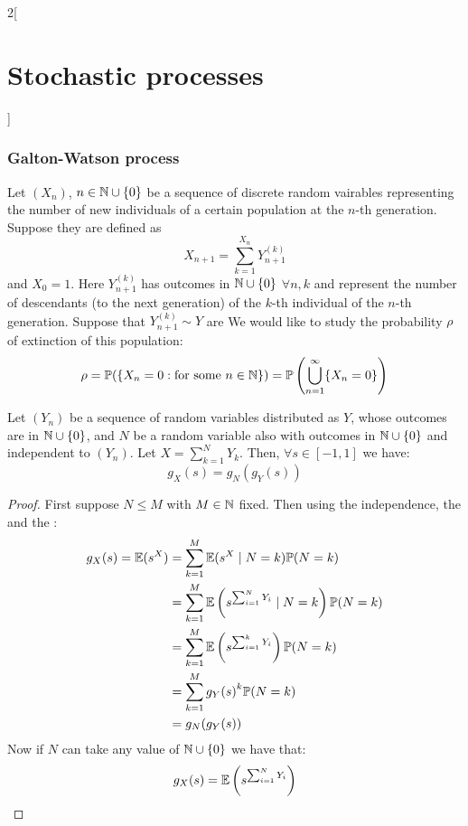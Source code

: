 \documentclass[../../../main_math.tex]{subfiles}
\begin{document}
\begin{multicols}{2}[\section{Stochastic processes}]
  \subsubsection{Galton-Watson process}
  \begin{model}\label{SP:galtonwatsonModel}
    Let $(X_n)$, $n\in\mathbb{N}\cup\{0\}$ be a sequence of discrete random vairables representing the number of new individuals of a certain population at the $n$-th generation. Suppose they are defined as $$X_{n+1}=\sum_{k=1}^{X_n}Y_{n+1}^{(k)}$$ and $X_0=1$. Here $Y_{n+1}^{(k)}$ has outcomes in $\mathbb{N}\cup\{0\}$ $\forall n,k$ and represent the number of descendants (to the next generation) of the $k$-th individual of the $n$-th generation. Suppose that $Y_{n+1}^{(k)}\sim Y$ are \iid We would like to study the probability $\rho$ of extinction of this population: $$\rho=\mathbb{P}(\{X_n=0:\text{for some $n\in\mathbb{N}$}\})=\mathbb{P}\left(\bigcup_{n=1}^\infty\{X_n=0\}\right)$$
  \end{model}
  \begin{lemma}\label{SP:lemmaGaltonWatson}
    Let $(Y_n)$ be a sequence of \iid random variables distributed as $Y$, whose outcomes are in $\mathbb{N}\cup\{0\}$, and $N$ be a random variable also with outcomes in $\mathbb{N}\cup\{0\}$ and independent to $(Y_n)$. Let $X=\sum_{k=1}^NY_k$. Then, $\forall s\in[-1,1]$ we have: $$g_X(s)=g_N(g_Y(s))$$
  \end{lemma}
  \begin{proof}
    First suppose $N\leq M$ with $M\in\mathbb{N}$ fixed. Then using the independence, the  and the :
    \begin{align*}
      g_X(s)=\mathbb{E}(s^X) & =\sum_{k=1}^M\mathbb{E}(s^X\mid N=k)\mathbb{P}(N=k)                                        \\
                       & = \sum_{k=1}^{M} \mathbb{E}\left(s^{\sum_{i=1}^{N}Y_i} \mid N = k\right) \mathbb{P}(N = k) \\
                       & = \sum_{k=1}^{M} \mathbb{E}\left(s^{\sum_{i=1}^{k}Y_i}\right) \mathbb{P}(N = k)            \\
                       & = \sum_{k=1}^{M} {g_Y(s)}^k \mathbb{P}(N = k)                                        \\
                       & = g_N(g_Y(s))
    \end{align*}
    Now if $N$ can take any value of $\mathbb{N}\cup\{0\}$ we have that:
    \begin{align*}
      g_X(s) & =\Exp\left(s^{\sum_{i=1}^{N}Y_i}\right)                          \\

\end{align*}
\end{proof}
\end{multicols}
\end{document}

